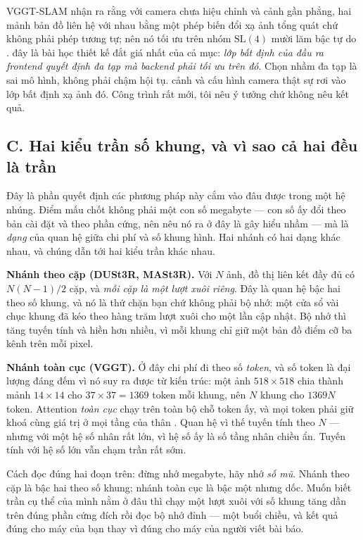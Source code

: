 \documentclass[../../deep_learning.tex]{subfiles}
\begin{document}
\begin{mach}
\item {}
\gp VGGT-SLAM nhận ra rằng với camera chưa hiệu chỉnh và cảnh gần phẳng, hai mảnh bản đồ liên hệ với nhau bằng một phép biến đổi xạ ảnh tổng quát chứ không phải phép tương tự; nên nó tối ưu trên nhóm \(\mathrm{SL}(4)\) mười lăm bậc tự do \cite{maggio2025vggtslam}.
\hq đây là bài học thiết kế đắt giá nhất của cả mục: \emph{lớp bất định của đầu ra frontend quyết định đa tạp mà backend phải tối ưu trên đó}. Chọn nhầm đa tạp là sai mô hình, không phải chậm hội tụ.
\gd cảnh và cấu hình camera thật sự rơi vào lớp bất định xạ ảnh đó. Công trình rất mới, tôi nêu ý tưởng chứ không nêu kết quả.
\end{mach}

\subsection{C. Hai kiểu trần số khung, và vì sao cả hai đều là trần}
Đây là phần quyết định các phương pháp này cắm vào đâu được trong một hệ nhúng. Điểm mấu chốt không phải một con số megabyte --- con số ấy đổi theo bản cài đặt và theo phần cứng, nên nêu nó ra ở đây là gây hiểu nhầm --- mà là \emph{dạng} của quan hệ giữa chi phí và số khung hình. Hai nhánh có hai dạng khác nhau, và chúng dẫn tới hai kiểu trần khác nhau.

\textbf{Nhánh theo cặp (DUSt3R, MASt3R).} Với \(N\) ảnh, đồ thị liên kết đầy đủ có \(N(N-1)/2\) cặp, và \emph{mỗi cặp là một lượt xuôi riêng}. Đây là quan hệ bậc hai theo số khung, và nó là thứ chặn bạn chứ không phải bộ nhớ: một cửa sổ vài chục khung đã kéo theo hàng trăm lượt xuôi cho một lần cập nhật. Bộ nhớ thì tăng tuyến tính và hiền hơn nhiều, vì mỗi khung chỉ giữ một bản đồ điểm cỡ ba kênh trên mỗi pixel.

\textbf{Nhánh toàn cục (VGGT).} Ở đây chi phí đi theo số \emph{token}, và số token là đại lượng đáng đếm vì nó suy ra được từ kiến trúc: một ảnh \(518\times518\) chia thành mảnh \(14\times14\) cho \(37\times37 = 1369\) token mỗi khung, nên \(N\) khung cho \(1369N\) token. Attention \emph{toàn cục} chạy trên toàn bộ chỗ token ấy, và mọi token phải giữ khoá cùng giá trị ở mọi tầng của thân . Quan hệ vì thế tuyến tính theo \(N\) --- nhưng với một hệ số nhân rất lớn, vì hệ số ấy là số tầng nhân chiều ẩn. Tuyến tính với hệ số lớn vẫn chạm trần rất sớm.

Cách đọc đúng hai đoạn trên: đừng nhớ megabyte, hãy nhớ \emph{số mũ}. Nhánh theo cặp là bậc hai theo số khung; nhánh toàn cục là bậc một nhưng dốc. Muốn biết trần cụ thể của mình nằm ở đâu thì chạy một lượt xuôi với số khung tăng dần trên đúng phần cứng đích rồi đọc bộ nhớ đỉnh --- một buổi chiều, và kết quả đúng cho máy của bạn thay vì đúng cho máy của người viết bài báo.
\end{document}
